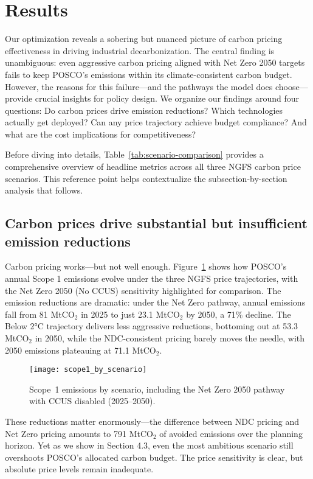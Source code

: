 \section{Results}

Our optimization reveals a sobering but nuanced picture of carbon pricing effectiveness in driving industrial decarbonization. The central finding is unambiguous: even aggressive carbon pricing aligned with Net Zero 2050 targets fails to keep POSCO's emissions within its climate-consistent carbon budget. However, the reasons for this failure—and the pathways the model does choose—provide crucial insights for policy design. We organize our findings around four questions: Do carbon prices drive emission reductions? Which technologies actually get deployed? Can any price trajectory achieve budget compliance? And what are the cost implications for competitiveness?

Before diving into details, Table~\ref{tab:scenario-comparison} provides a comprehensive overview of headline metrics across all three NGFS carbon price scenarios. This reference point helps contextualize the subsection-by-section analysis that follows.

\subsection{Carbon prices drive substantial but insufficient emission reductions}

Carbon pricing works—but not well enough. Figure~\ref{fig:scope1-by-scenario} shows how POSCO's annual Scope 1 emissions evolve under the three NGFS price trajectories, with the Net Zero 2050 (No CCUS) sensitivity highlighted for comparison. The emission reductions are dramatic: under the Net Zero pathway, annual emissions fall from 81 MtCO$_2$ in 2025 to just 23.1 MtCO$_2$ by 2050, a 71\% decline. The Below 2°C trajectory delivers less aggressive reductions, bottoming out at 53.3 MtCO$_2$ in 2050, while the NDC-consistent pricing barely moves the needle, with 2050 emissions plateauing at 71.1 MtCO$_2$.

\begin{figure}[!t]
  \centering
  \texttt{[image: scope1\_by\_scenario]}
  \caption{Scope~1 emissions by scenario, including the Net Zero 2050 pathway with CCUS disabled (2025--2050).}
  \label{fig:scope1-by-scenario}
\end{figure}

These reductions matter enormously—the difference between NDC pricing and Net Zero pricing amounts to 791 MtCO$_2$ of avoided emissions over the planning horizon. Yet as we show in Section 4.3, even the most ambitious scenario still overshoots POSCO's allocated carbon budget. The price sensitivity is clear, but absolute price levels remain inadequate.

